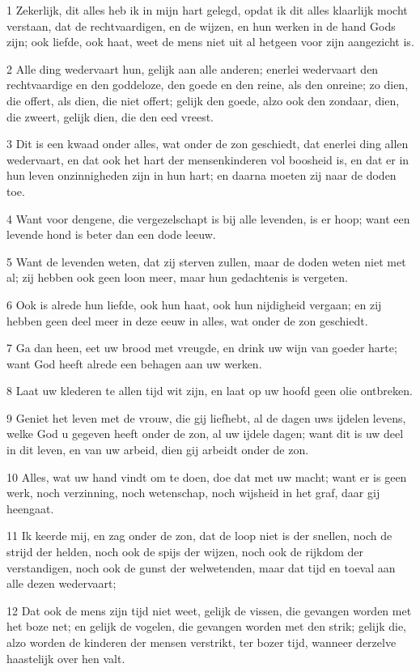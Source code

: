 \par 1 Zekerlijk, dit alles heb ik in mijn hart gelegd, opdat ik dit alles klaarlijk mocht verstaan, dat de rechtvaardigen, en de wijzen, en hun werken in de hand Gods zijn; ook liefde, ook haat, weet de mens niet uit al hetgeen voor zijn aangezicht is.
\par 2 Alle ding wedervaart hun, gelijk aan alle anderen; enerlei wedervaart den rechtvaardige en den goddeloze, den goede en den reine, als den onreine; zo dien, die offert, als dien, die niet offert; gelijk den goede, alzo ook den zondaar, dien, die zweert, gelijk dien, die den eed vreest.
\par 3 Dit is een kwaad onder alles, wat onder de zon geschiedt, dat enerlei ding allen wedervaart, en dat ook het hart der mensenkinderen vol boosheid is, en dat er in hun leven onzinnigheden zijn in hun hart; en daarna moeten zij naar de doden toe.
\par 4 Want voor dengene, die vergezelschapt is bij alle levenden, is er hoop; want een levende hond is beter dan een dode leeuw.
\par 5 Want de levenden weten, dat zij sterven zullen, maar de doden weten niet met al; zij hebben ook geen loon meer, maar hun gedachtenis is vergeten.
\par 6 Ook is alrede hun liefde, ook hun haat, ook hun nijdigheid vergaan; en zij hebben geen deel meer in deze eeuw in alles, wat onder de zon geschiedt.
\par 7 Ga dan heen, eet uw brood met vreugde, en drink uw wijn van goeder harte; want God heeft alrede een behagen aan uw werken.
\par 8 Laat uw klederen te allen tijd wit zijn, en laat op uw hoofd geen olie ontbreken.
\par 9 Geniet het leven met de vrouw, die gij liefhebt, al de dagen uws ijdelen levens, welke God u gegeven heeft onder de zon, al uw ijdele dagen; want dit is uw deel in dit leven, en van uw arbeid, dien gij arbeidt onder de zon.
\par 10 Alles, wat uw hand vindt om te doen, doe dat met uw macht; want er is geen werk, noch verzinning, noch wetenschap, noch wijsheid in het graf, daar gij heengaat.
\par 11 Ik keerde mij, en zag onder de zon, dat de loop niet is der snellen, noch de strijd der helden, noch ook de spijs der wijzen, noch ook de rijkdom der verstandigen, noch ook de gunst der welwetenden, maar dat tijd en toeval aan alle dezen wedervaart;
\par 12 Dat ook de mens zijn tijd niet weet, gelijk de vissen, die gevangen worden met het boze net; en gelijk de vogelen, die gevangen worden met den strik; gelijk die, alzo worden de kinderen der mensen verstrikt, ter bozer tijd, wanneer derzelve haastelijk over hen valt.
